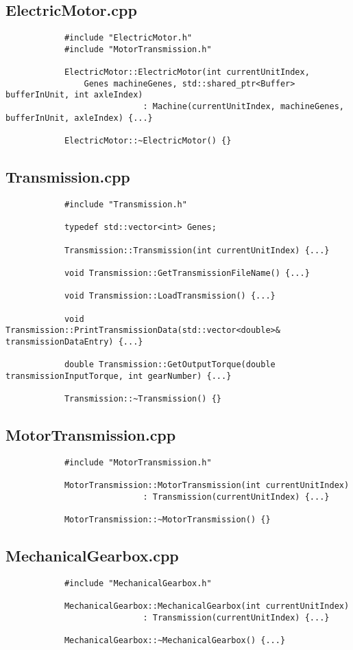 \documentclass[ExampleMasters.tex]{subfiles}
\begin{document}
		\subsection{ElectricMotor.cpp}\label{sec:appendixelectricmotor}
			\begin{verbatim}
			#include "ElectricMotor.h"
			#include "MotorTransmission.h"

			ElectricMotor::ElectricMotor(int currentUnitIndex, 
				Genes machineGenes, std::shared_ptr<Buffer> bufferInUnit, int axleIndex) 
							: Machine(currentUnitIndex, machineGenes, bufferInUnit, axleIndex) {...}

			ElectricMotor::~ElectricMotor() {}
			\end{verbatim}

		\subsection{Transmission.cpp}\label{sec:appendixtransmission}
			\begin{verbatim}
			#include "Transmission.h"

			typedef std::vector<int> Genes;

			Transmission::Transmission(int currentUnitIndex) {...}

			void Transmission::GetTransmissionFileName() {...}

			void Transmission::LoadTransmission() {...}

			void Transmission::PrintTransmissionData(std::vector<double>& transmissionDataEntry) {...}

			double Transmission::GetOutputTorque(double transmissionInputTorque, int gearNumber) {...}

			Transmission::~Transmission() {}
			\end{verbatim}

		\subsection{MotorTransmission.cpp}\label{sec:appendixmotortransmission}
			\begin{verbatim}
			#include "MotorTransmission.h"

			MotorTransmission::MotorTransmission(int currentUnitIndex) 
							: Transmission(currentUnitIndex) {...}

			MotorTransmission::~MotorTransmission() {}
			\end{verbatim}

		\subsection{MechanicalGearbox.cpp}\label{sec:appendixmechanicalgearbox}
			\begin{verbatim}
			#include "MechanicalGearbox.h"

			MechanicalGearbox::MechanicalGearbox(int currentUnitIndex) 
							: Transmission(currentUnitIndex) {...}

			MechanicalGearbox::~MechanicalGearbox() {...}
			\end{verbatim}
\end{document}
